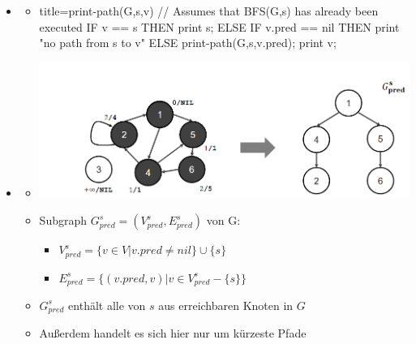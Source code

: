 \documentclass[
    12pt,
    a4paper,
    ngerman,
    color=3b,%
    marginpar=false,
    colorback=false,
    leqno,
]{tudaexercise}
\begin{document}
\begin{itemize}
        \item {}
            \begin{itemize}
                \item[]
                    \begin{ccode}[autogobble]{title={print-path(G,s,v) // Assumes that BFS(G,s) has already been executed}}
                    IF v == s THEN
                        print s;
                    ELSE
                        IF v.pred == nil THEN
                            print "no path from s to v"
                        ELSE
                            print-path(G,s,v.pred);
                            print v;
                    \end{ccode}
            \end{itemize}

        \item {}
            \begin{itemize}
                \item[] \includegraphics[width=14cm]{pictures/bfsBaum.PNG}
                \item Subgraph $G^s_{pred} = (V^s_{pred},E^s_{pred})$ von G:
                    \begin{itemize}
                        \item $V^s_{pred} = \{v \in V | v.pred \neq nil\} \cup \{s\}$
                        \item $E^s_{pred} = \{(v.pred,v) | v \in V^s_{pred} - \{s\}\}$
                    \end{itemize}
                \item $G^s_{pred}$ enthält alle von $s$ aus erreichbaren Knoten in $G$
                \item Außerdem handelt es sich hier nur um kürzeste Pfade
            \end{itemize}
    \end{itemize}
\end{document}
